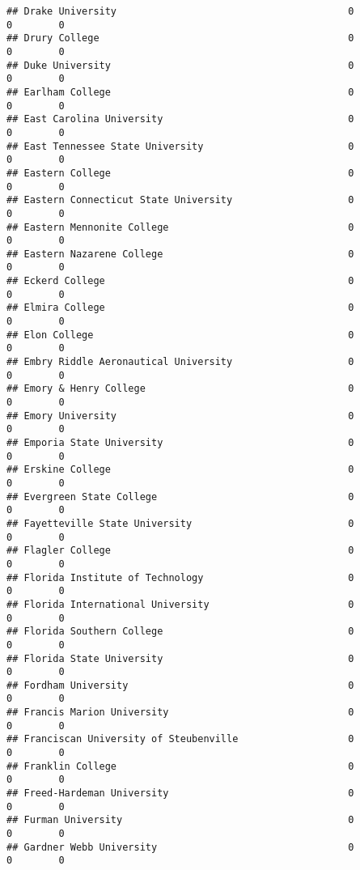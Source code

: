 \documentclass[
]{article}
\begin{document}
\begin{verbatim}
## Drake University                                        0           0        0
## Drury College                                           0           0        0
## Duke University                                         0           0        0
## Earlham College                                         0           0        0
## East Carolina University                                0           0        0
## East Tennessee State University                         0           0        0
## Eastern College                                         0           0        0
## Eastern Connecticut State University                    0           0        0
## Eastern Mennonite College                               0           0        0
## Eastern Nazarene College                                0           0        0
## Eckerd College                                          0           0        0
## Elmira College                                          0           0        0
## Elon College                                            0           0        0
## Embry Riddle Aeronautical University                    0           0        0
## Emory & Henry College                                   0           0        0
## Emory University                                        0           0        0
## Emporia State University                                0           0        0
## Erskine College                                         0           0        0
## Evergreen State College                                 0           0        0
## Fayetteville State University                           0           0        0
## Flagler College                                         0           0        0
## Florida Institute of Technology                         0           0        0
## Florida International University                        0           0        0
## Florida Southern College                                0           0        0
## Florida State University                                0           0        0
## Fordham University                                      0           0        0
## Francis Marion University                               0           0        0
## Franciscan University of Steubenville                   0           0        0
## Franklin College                                        0           0        0
## Freed-Hardeman University                               0           0        0
## Furman University                                       0           0        0
## Gardner Webb University                                 0           0        0

\end{verbatim}
\end{document}
